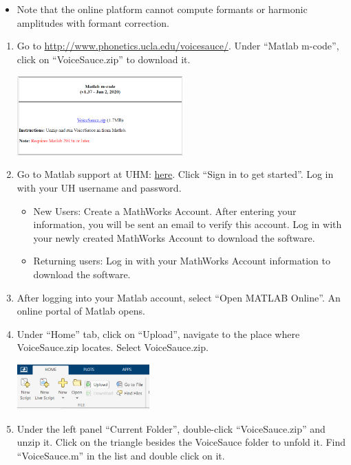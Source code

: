 \documentclass[
]{article}
\providecommand{\tightlist}{%
  \setlength{\itemsep}{0pt}\setlength{\parskip}{0pt}}
\begin{document}
\begin{itemize}
\tightlist
\item
  Note that the online platform cannot compute formants or harmonic
  amplitudes with formant correction.
\end{itemize}

\begin{enumerate}
\def\labelenumi{\arabic{enumi}.}
\tightlist
\item
  Go to \url{http://www.phonetics.ucla.edu/voicesauce/}. Under ``Matlab
  m-code'', click on ``VoiceSauce.zip'' to download it.

  \includegraphics[width=0.5\textwidth,height=\textheight]{image/vs_matlabzip.png}
\item
  Go to Matlab support at UHM:
  \href{https://www.mathworks.com/academia/tah-portal/university-of-hawaii-manoa-40591263.html}{here}.
  Click ``Sign in to get started''. Log in with your UH username and
  password.

  \begin{itemize}
  \tightlist
  \item
    New Users: Create a MathWorks Account. After entering your
    information, you will be sent an email to verify this account. Log
    in with your newly created MathWorks Account to download the
    software.
  \item
    Returning users: Log in with your MathWorks Account information to
    download the software.
  \end{itemize}
\item
  After logging into your Matlab account, select ``Open MATLAB Online''.
  An online portal of Matlab opens.
\item
  Under ``Home'' tab, click on ``Upload'', navigate to the place where
  VoiceSauce.zip locates. Select VoiceSauce.zip.

  \includegraphics[width=0.4\textwidth,height=\textheight]{image/vs_import_online.png}
\item
  Under the left panel ``Current Folder'', double-click
  ``VoiceSauce.zip'' and unzip it. Click on the triangle besides the
  VoiceSauce folder to unfold it. Find ``VoiceSauce.m'' in the list and
  double click on it.


\end{enumerate}
\end{document}
